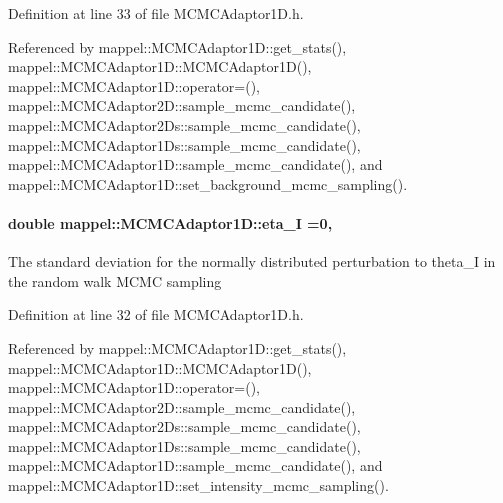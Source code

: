 Definition at line 33 of file M\+C\+M\+C\+Adaptor1\+D.\+h.



Referenced by mappel\+::\+M\+C\+M\+C\+Adaptor1\+D\+::get\+\_\+stats(), mappel\+::\+M\+C\+M\+C\+Adaptor1\+D\+::\+M\+C\+M\+C\+Adaptor1\+D(), mappel\+::\+M\+C\+M\+C\+Adaptor1\+D\+::operator=(), mappel\+::\+M\+C\+M\+C\+Adaptor2\+D\+::sample\+\_\+mcmc\+\_\+candidate(), mappel\+::\+M\+C\+M\+C\+Adaptor2\+Ds\+::sample\+\_\+mcmc\+\_\+candidate(), mappel\+::\+M\+C\+M\+C\+Adaptor1\+Ds\+::sample\+\_\+mcmc\+\_\+candidate(), mappel\+::\+M\+C\+M\+C\+Adaptor1\+D\+::sample\+\_\+mcmc\+\_\+candidate(), and mappel\+::\+M\+C\+M\+C\+Adaptor1\+D\+::set\+\_\+background\+\_\+mcmc\+\_\+sampling().

\paragraph[{\texorpdfstring{eta\+\_\+I}{eta_I}}]{\setlength{\rightskip}{0pt plus 5cm}double mappel\+::\+M\+C\+M\+C\+Adaptor1\+D\+::eta\+\_\+I =0\hspace{0.3cm}{\ttfamily [protected]}, {\ttfamily [inherited]}}\hypertarget{classmappel_1_1MCMCAdaptor1D_a5780d326be0c40e10d6c91777cfffbd3}{}\label{classmappel_1_1MCMCAdaptor1D_a5780d326be0c40e10d6c91777cfffbd3}
The standard deviation for the normally distributed perturbation to theta\+\_\+I in the random walk M\+C\+MC sampling 

Definition at line 32 of file M\+C\+M\+C\+Adaptor1\+D.\+h.



Referenced by mappel\+::\+M\+C\+M\+C\+Adaptor1\+D\+::get\+\_\+stats(), mappel\+::\+M\+C\+M\+C\+Adaptor1\+D\+::\+M\+C\+M\+C\+Adaptor1\+D(), mappel\+::\+M\+C\+M\+C\+Adaptor1\+D\+::operator=(), mappel\+::\+M\+C\+M\+C\+Adaptor2\+D\+::sample\+\_\+mcmc\+\_\+candidate(), mappel\+::\+M\+C\+M\+C\+Adaptor2\+Ds\+::sample\+\_\+mcmc\+\_\+candidate(), mappel\+::\+M\+C\+M\+C\+Adaptor1\+Ds\+::sample\+\_\+mcmc\+\_\+candidate(), mappel\+::\+M\+C\+M\+C\+Adaptor1\+D\+::sample\+\_\+mcmc\+\_\+candidate(), and mappel\+::\+M\+C\+M\+C\+Adaptor1\+D\+::set\+\_\+intensity\+\_\+mcmc\+\_\+sampling().

